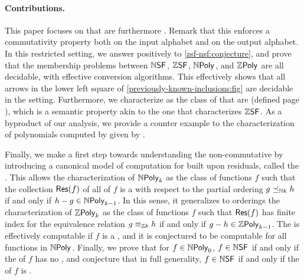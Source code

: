 \paragraph{Contributions.} This paper focuses on  that are furthermore . Remark that this enforces a
commutativity property both on the input alphabet and on the output alphabet.
In this restricted setting, we answer positively to \cref{zsf-nsf:conjecture},
and prove that the membership problems between $\NSF$, $\ZSF$, $\NPoly$, and
$\ZPoly$ are all decidable, with effective conversion algorithms. This
effectively shows that all arrows in the lower left square of
\cref{previously-known-inclusions:fig} are decidable in the 
setting. Furthermore, we characterize   as the class of  that are
 (defined page ), which is a semantic
property akin to the one  that characterizes $\ZSF$.
As a byproduct of our analysis, we provide a counter example to the
characterization of polynomials computed by  given
by \textcite[Theorem 3.3, page 4; re-introduced as \cref{karh:thm}]{KARH77}.

Finally, we make a first step towards understanding the non-commutative by
introducing a canonical model of computation for  built upon residuals, called the . This
allows the characterization of $\NPoly[k]$ as the class of functions $f$ such
that the collection $\mathsf{Res}(f)$ of all  of $f$ is a
 with respect to the partial ordering $g \npolyleq[k]
h$ if and only if $h - g \in \NPoly[k-1]$. In this sense, it generalizes to
orderings the characterization of $\ZPoly[k]$ as the class of functions $f$
such that $\mathsf{Res}(f)$ has finite index for the equivalence relation $g
\zpolyequiv[k] h$ if and only if $g - h \in \ZPoly[k-1]$. The  is effectively computable if $f$ is a 
, and it is conjectured to be computable for
all functions in $\NPoly$. Finally, we prove that for $f \in \NPoly[0]$, $f \in
\NSF$ if and only if the  of $f$ has no ,
and conjecture that in full generality, $f \in \NSF$ if and only if the
 of $f$ is .

